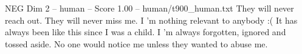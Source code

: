\begin{textsample}{NEG Dim 2 – human – Score 1.00 – human/t900\_human.txt}  \label{ex:f2_neg_027}
They will never reach out.
They will never miss me.
I ’m nothing relevant to anybody :( It has always been like this since I was a child.
I ’m always forgotten, ignored and tossed aside.
No one would notice me unless they wanted to abuse me.

\end{textsample}

